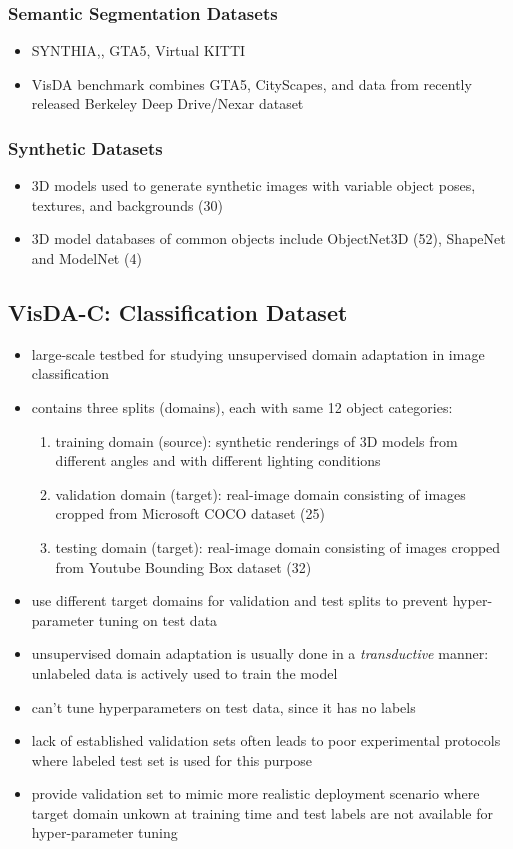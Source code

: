 \documentclass[]{article}
\begin{document}
\subsubsection{Semantic Segmentation Datasets}
\begin{itemize}
	\item SYNTHIA,, GTA5, Virtual KITTI
	\item VisDA benchmark combines GTA5, CityScapes, and data from recently released Berkeley Deep Drive/Nexar dataset
\end{itemize}

\subsubsection{Synthetic Datasets}
\begin{itemize}
	\item 3D models used to generate synthetic images with variable object poses, textures, and backgrounds (30)
	\item 3D model databases of common objects include ObjectNet3D (52), ShapeNet and ModelNet (4)
\end{itemize}

\subsection{VisDA-C: Classification Dataset}
\begin{itemize}
	\item large-scale testbed for studying unsupervised domain adaptation in image classification 
	\item contains three splits (domains), each with same 12 object categories:
	\begin{enumerate}
		\item training domain (source): synthetic renderings of 3D models from different angles and with different lighting conditions
		\item validation domain (target): real-image domain consisting of images cropped from Microsoft COCO dataset (25)
		\item testing domain (target): real-image domain consisting of images cropped from Youtube Bounding Box dataset (32)
	\end{enumerate}
	\item use different target domains for validation and test splits to prevent hyper-parameter tuning on test data
	\item unsupervised domain adaptation is usually done in a \textit{transductive} manner: unlabeled data is actively used to train the model
	\item can't tune hyperparameters on test data, since it has no labels
	\item lack of established validation sets often leads to poor experimental protocols where labeled test set is used for this purpose
	\item provide validation set to mimic more realistic deployment scenario where target domain unkown at training time and test labels are not available for hyper-parameter tuning
\end{itemize}
\end{document}
